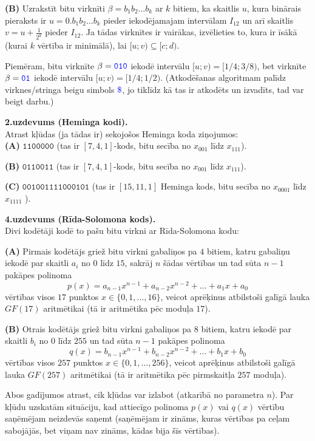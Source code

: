 \documentclass[a4paper]{article}
\begin{document}
\vspace{5pt}
{\bf (B)} Uzrakstīt bitu virknīti $\beta = b_1b_2\ldots{}b_k$ ar $k$ bitiem, ka 
skaitlis $u$, kura binārais pieraksts ir $u = 0.b_1b_2\ldots{}b_k$ pieder iekodējamajam intervālam 
$I_{12}$ un arī skaitlis $v = u + \frac{1}{2^k}$ pieder $I_{12}$. Ja tādas virknītes ir 
vairākas, izvēlieties to, kura ir īsākā (kurai $k$ vērtība ir minimālā), lai $[u;v) \subseteq [c;d)$. 

\vspace{5pt}
Piemēram, bitu virknīte $\beta = \textcolor{blue}{\mathtt{010}}$ iekodē intervālu $[u;v) = [1/4;3/8)$, 
bet virknīte $\beta = \textcolor{blue}{\mathtt{01}}$ iekodē intervālu $[u;v) = [1/4; 1/2)$. 
(Atkodēšanas algoritmam palīdz virknes/stringa beigu simbols $\textcolor{blue}{\mathtt{\$}}$, jo 
tiklīdz kā tas ir atkodēts un izvadīts, tad var beigt darbu.)


\vspace{20pt}
{\bf 2.uzdevums (Heminga kodi).}\\
Atrast kļūdas (ja tādas ir) sekojošos Heminga koda ziņojumos:\\
{\bf (A)} $\mathtt{1100000}$ (tas ir $[7,4,1]$-kods, bitu secība no $x_{001}$ līdz $x_{111}$). 

\vspace{5pt}
{\bf (B)} $\mathtt{0110011}$ (tas ir $[7,4,1]$-kods, bitu secība no $x_{001}$ līdz $x_{111}$). 

\vspace{5pt}
{\bf (C)} $\mathtt{001001111000101}$ (tas ir $[15,11,1]$ Heminga kods, bitu secība \textendash{} no $x_{0001}$ līdz
$x_{1111}$ ).



\vspace{20pt}
{\bf 4.uzdevums (Rīda-Solomona kods).}\\
Divi kodētāji kodē to pašu bitu virkni ar Rīda-Solomona kodu:

\vspace{5pt}
{\bf (A)} Pirmais kodētājs griež bitu virkni 
gabaliņos pa $4$ bitiem, katru gabaliņu iekodē par skaitli $a_i$ no $0$ līdz $15$, sakrāj $n$ šādas vērtības 
un tad sūta $n-1$ pakāpes polinoma 
$$p(x) = a_{n-1}x^{n-1} + a_{n-2}x^{n-2} + \ldots + a_1x + a_0$$
vērtības visos $17$ punktos $x \in \{ 0,1,\ldots,16 \}$, veicot aprēķinus atbilstoši galīgā lauka $GF(17)$ 
aritmētikai (tā ir aritmētika pēc moduļa $17$).

\vspace{5pt}
{\bf (B)} Otrais kodētājs griež bitu virkni gabaliņos pa $8$ bitiem, katru iekodē par skaitli $b_i$ no $0$ līdz $255$ 
un tad sūta $n-1$ pakāpes polinoma 
$$q(x) = b_{n-1}x^{n-1} + b_{n-2}x^{n-2} + \ldots + b_1x + b_0$$
vērtības visos $257$ punktos $x \in \{ 0,1,\ldots,256 \}$, vei\-cot aprēķinus atbilstoši galīgā lauka $GF(257)$ 
aritmētikai (tā ir aritmētika pēc pirmskaitļa $257$ moduļa). 

\vspace{5pt}
Abos gadījumos atrast, cik kļūdas var izlabot (at\-ka\-rī\-bā no parametra $n$). Par kļūdu uzskatām situāciju, kad 
attiecīgo polinoma $p(x)$ vai $q(x)$ vērtību saņēmējam neizdevās saņemt (saņēmējam ir zināms, kuras vērtības pa ceļam 
sabojājās, bet viņam nav zināms, kādas bija šīs vērtības). 
\end{document}
